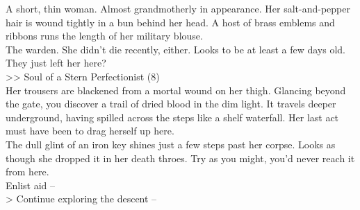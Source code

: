 A short, thin woman. Almost grandmotherly in appearance. Her salt-and-pepper hair is wound tightly in a bun behind her head. A host of brass emblems and ribbons runs the length of her military blouse.\\

The warden. She didn’t die recently, either. Looks to be at least a few days old. They just left her here?\\
>> Soul of a Stern Perfectionist (8)\\

Her trousers are blackened from a mortal wound on her thigh. Glancing beyond the gate, you discover a trail of dried blood in the dim light. It travels deeper underground, having spilled across the steps like a shelf waterfall. Her last act must have been to drag herself up here.\\

The dull glint of an iron key shines just a few steps past her corpse. Looks as though she dropped it in her death throes. Try as you might, you’d never reach it from here.\\

 Enlist aid -- \\
> Continue exploring the descent -- 